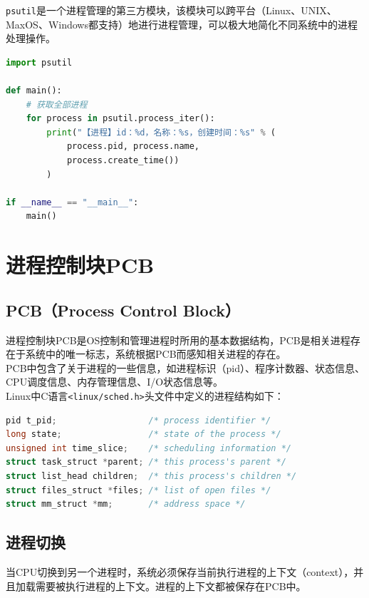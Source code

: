 \lstinline|psutil|是一个进程管理的第三方模块，该模块可以跨平台（Linux、UNIX、MaxOS、Windows都支持）地进行进程管理，可以极大地简化不同系统中的进程处理操作。

\begin{lstlisting}[language=Python, title=获取全部进程信息]
import psutil

def main():
	# 获取全部进程
	for process in psutil.process_iter():
		print("【进程】id：%d，名称：%s，创建时间：%s" % (
			process.pid, process.name,
			process.create_time())
		)

if __name__ == "__main__":
	main()
\end{lstlisting}

\newpage

\section{进程控制块PCB}

\subsection{PCB（Process Control Block）}

进程控制块PCB是OS控制和管理进程时所用的基本数据结构，PCB是相关进程存在于系统中的唯一标志，系统根据PCB而感知相关进程的存在。 \\

PCB中包含了关于进程的一些信息，如进程标识（pid）、程序计数器、状态信息、CPU调度信息、内存管理信息、I/O状态信息等。 \\

Linux中C语言\lstinline|<linux/sched.h>|头文件中定义的进程结构如下：

\begin{lstlisting}[language=C, title=进程结构]
pid t_pid;					/* process identifier */
long state;					/* state of the process */
unsigned int time_slice;	/* scheduling information */
struct task_struct *parent;	/* this process's parent */
struct list_head children;	/* this process's children */
struct files_struct *files;	/* list of open files */
struct mm_struct *mm;		/* address space */
\end{lstlisting}

\subsection{进程切换}

当CPU切换到另一个进程时，系统必须保存当前执行进程的上下文（context），并且加载需要被执行进程的上下文。进程的上下文都被保存在PCB中。

